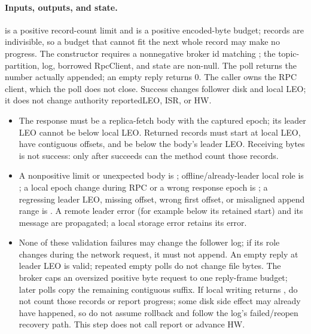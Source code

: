 \paragraph{Inputs, outputs, and state.} is a positive record-count limit and  is a positive encoded-byte budget; records are indivisible, so a budget that cannot fit the next whole record may make no progress. The constructor requires a nonnegative broker id matching ; the topic-partition, log, borrowed RpcClient, and state are non-null. The poll returns the number actually appended; an empty reply returns 0. The caller owns the RPC client, which the poll does not close. Success changes follower disk and local LEO; it does not change authority reportedLEO, ISR, or HW.
\begin{itemize}
\item The response must be a replica-fetch body with the captured epoch; its leader LEO cannot be below local LEO. Returned records must start at local LEO, have contiguous offsets, and be below the body's leader LEO. Receiving bytes is not success: only after  succeeds can the method count those records.
\item A nonpositive limit or unexpected body is ; offline/already-leader local role is ; a local epoch change during RPC or a wrong response epoch is ; a regressing leader LEO, missing offset, wrong first offset, or misaligned append range is . A remote leader error (for example  below its retained start) and its message are propagated; a local storage error retains its error.
\item None of these validation failures may change the follower log; if its role changes during the network request, it must not append. An empty reply at leader LEO is valid; repeated empty polls do not change file bytes. The broker caps an oversized positive byte request to one reply-frame budget; later polls copy the remaining contiguous suffix. If local writing returns , do not count those records or report progress; some disk side effect may already have happened, so do not assume rollback and follow the log's failed/reopen recovery path. This step does not call report or advance HW.
\end{itemize}
